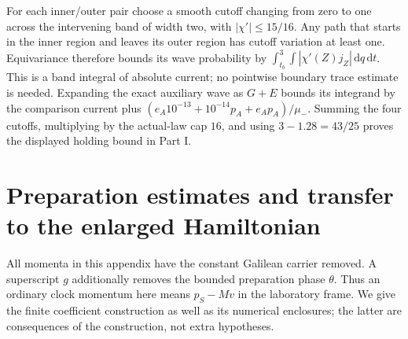 \documentclass[11pt]{article}
\theoremstyle{definition}\newtheorem{definition}[theorem]{Definition}
\theoremstyle{remark}\newtheorem{remark}[theorem]{Remark}
\newcommand{\dd}{\,\mathrm d}\newcommand{\Imv}{\operatorname{Im}}\newcommand{\ii}{\mathrm i}
\begin{document}
For each inner/outer pair choose a smooth cutoff changing from zero
to one across the intervening band of width two, with
$|\chi'|\le15/16$. Any path that starts in the inner region and
leaves its outer region has cutoff variation at least one. Equivariance
therefore bounds its wave probability by
$\int_{t_b}^3\int |\chi'(Z)j_Z|\dd q\dd t$.
This is a band integral of absolute current; no pointwise boundary
trace estimate is needed. Expanding the exact auxiliary wave as
$G+E$ bounds its integrand by the comparison current plus
$(e_A10^{-13}+10^{-14}p_A+e_Ap_A)/\mu_-$.
Summing the four cutoffs, multiplying by the actual-law cap $16$,
and using $3-1.28=43/25$ proves the displayed holding bound in Part I.


\section{Preparation estimates and transfer to the enlarged Hamiltonian}
\label{prep:main}
All momenta in this appendix have the constant Galilean carrier removed.
A superscript $g$ additionally removes the bounded preparation phase
$\theta$. Thus an ordinary clock momentum here means $p_S-Mv$ in the
laboratory frame. We give the finite coefficient construction as well as
its numerical enclosures; the latter are consequences of the construction,
not extra hypotheses.
\end{document}
